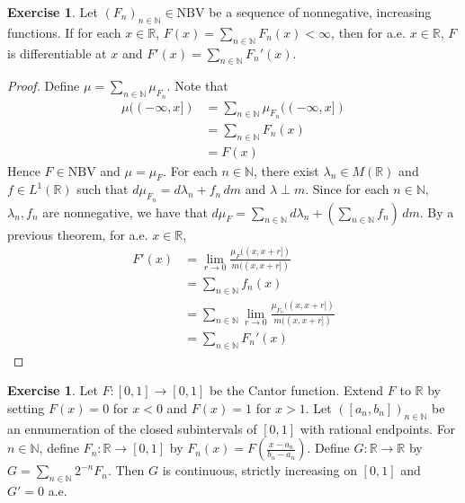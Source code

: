 \documentclass[12pt]{amsart}
\theoremstyle{definition}
\newtheorem{ex}[definition]{Exercise}
\newcommand{\lam}{\lambda}
\newcommand{\N}{\mathbb{N}}
\newcommand{\R}{\mathbb{R}}
\newcommand{\dm}{\, d m}
\newcommand{\NBV}{\text{NBV}}
\newcommand{\lex}[1]{\label{ex:#1}}
\begin{document}
	\begin{ex} \lex{00000} 
		Let $(F_n)_{n\in \N} \in \NBV$ be a sequence of nonnegative, increasing functions. If for each $x \in \R$, $F(x)=\sum_{n \in \N}F_n(x)< \infty$, then for a.e. $x \in \R$, $F$ is differentiable at $x$ and $F'(x) = \sum_{n\in \N}F_n'(x)$. 
	\end{ex}
	
	\begin{proof}
		
		Define $\mu = \sum_{n \in \N}\mu_{F_n}$. Note that 
		\begin{align*}
			\mu((-\infty,x]) 
			&= \sum_{n \in \N}\mu_{F_n}((-\infty,x]) \\
			&= \sum_{n \in \N}F_n(x)\\
			&= F(x)
		\end{align*}
		Hence $F \in \NBV$ and $\mu=\mu_F$. For each $n \in \N$, there exist $\lam_n \in M(\R)$ and $f \in L^1(\R)$ such that $d\mu_{F_n} = d\lam_n + f_n\dm$ and $\lam \perp m$. Since for each $n \in \N$, $\lam_n, f_n$ are nonnegative, we have that $d\mu_F =  \sum_{n \in \N} d\lam_n + (\sum_{n \in \N}f_n)\dm$. By a previous theorem, for a.e. $x \in \R$, 
		\begin{align*}
			F'(x) 
			&= \lim_{r \rightarrow 0}\frac{\mu_F((x,x+r])}{m((x,x+r])} \\
			&= \sum_{n \in \N}f_n(x)\\
			&= \sum_{n \in \N}\lim_{r \rightarrow 0}\frac{\mu_{F_n}((x,x+r])}{m((x,x+r])} \\
			&= \sum_{n \in \N}F_n'(x)
		\end{align*}
	\end{proof}
	
	\begin{ex} \lex{00000} 
		Let $F:[0,1]\rightarrow [0, 1]$ be the Cantor function. Extend $F$ to $\R$ by setting $F(x) = 0$ for $x<0$ and $F(x)=1$ for $x>1$. Let $([a_n,b_n])_{n \in \N}$ be an ennumeration of the closed subintervals of $[0,1]$ with rational endpoints. For $n \in \N$, define $F_n:\R \rightarrow [0,1]$ by $F_n(x) = F(\frac{x-a_n}{b_n-a_n})$. Define $G:\R \rightarrow \R$ by $G = \sum_{n \in \N}2^{-n}F_n$. Then $G$ is continuous, strictly increasing on $[0,1]$ and $G'=0$ a.e.
	\end{ex}
	
\end{document}
